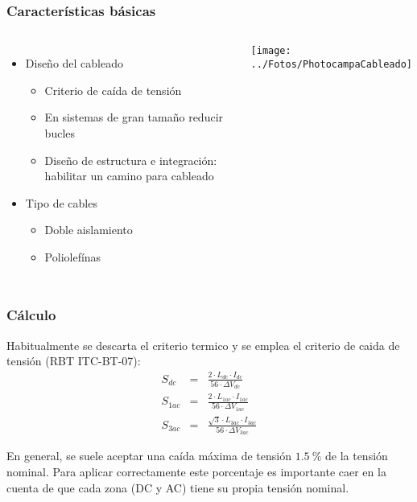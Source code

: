 \documentclass[serif, xcolor=dvipsnames]{beamer}
\begin{document}
\begin{frame}
  \frametitle{Características básicas}
  \begin{columns}[c]%


    \column{6cm}
    \begin{itemize}
    \item Diseño del cableado

      \begin{itemize}
      \item Criterio de caída de tensión
      \item En sistemas de gran tamaño reducir bucles
      \item Diseño de estructura e integración: habilitar un camino
        para cableado
      \end{itemize}
    \item Tipo de cables

      \begin{itemize}
      \item Doble aislamiento
      \item Poliolefínas
      \end{itemize}
    \end{itemize}

    \column{6cm}

    \texttt{[image: ../Fotos/PhotocampaCableado]}

  \end{columns}%

\end{frame}
\begin{frame}
  \frametitle{Cálculo}

  Habitualmente se descarta el criterio termico y se emplea el
  criterio de caida de tensión (RBT ITC-BT-07):\begin{eqnarray*}
    S_{dc} & = & \frac{2\cdot L_{dc}\cdot I_{dc}}{56\cdot\Delta V_{dc}}\\
    S_{1ac} & = & \frac{2\cdot L_{1ac}\cdot I_{1ac}}{56\cdot\Delta V_{1ac}}\\
    S_{3ac} & = & \frac{\sqrt{3}\cdot L_{3ac}\cdot
      I_{3ac}}{56\cdot\Delta V_{3ac}}\end{eqnarray*}


  En general, se suele aceptar una caída máxima de tensión
  $\SI{1.5}{\percent}$ de la tensión nominal. Para aplicar
  correctamente este porcentaje es importante caer en la cuenta de que
  cada zona (DC y AC) tiene su propia tensión nominal.


\end{frame}
\end{document}
